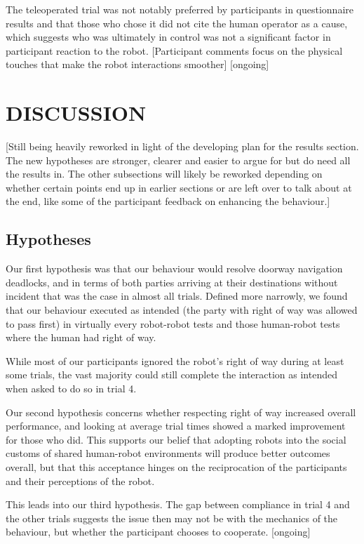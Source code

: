 \documentclass[letterpaper, 10 pt, conference]{ieeeconf}  %
\begin{document}
The teleoperated trial was not notably preferred by participants in questionnaire results and that those who chose it did not cite the human operator as a cause, which suggests who was ultimately in control was not a significant factor in participant reaction to the robot. [Participant comments focus on the physical touches that make the robot interactions smoother] [ongoing]


\section{DISCUSSION}

[Still being heavily reworked in light of the developing plan for the results section. The new hypotheses are stronger, clearer and easier to argue for but do need all the results in. The other subsections will likely be reworked depending on whether certain points end up in earlier sections or are left over to talk about at the end, like some of the participant feedback on enhancing the behaviour.]

\subsection{Hypotheses}

Our first hypothesis was that our behaviour would resolve doorway navigation deadlocks, and in terms of both parties arriving at their destinations without incident that was the case in almost all trials. Defined more narrowly, we found that our behaviour executed as intended (the party with right of way was allowed to pass first) in virtually every robot-robot tests and those human-robot tests where the human had right of way. 

While most of our participants ignored the robot's right of way during at least some trials, the vast majority could still complete the interaction as intended when asked to do so in trial 4. 

Our second hypothesis concerns whether respecting right of way increased overall performance, and looking at average trial times showed a marked improvement for those who did. This supports our belief that adopting robots into the social customs of shared human-robot environments will produce better outcomes overall, but that this acceptance hinges on the reciprocation of the participants and their perceptions of the robot.

This leads into our third hypothesis. The gap between compliance in trial 4 and the other trials suggests the issue then may not be with the mechanics of the behaviour, but whether the participant chooses to cooperate. [ongoing]
\end{document}
